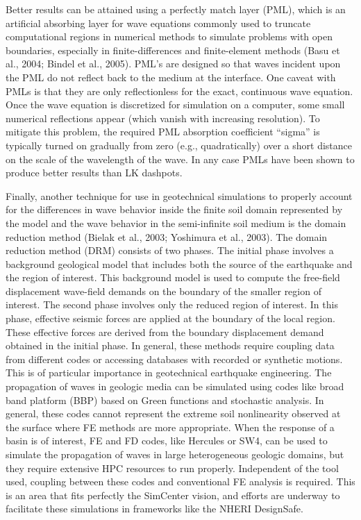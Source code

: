 Better results can be attained using a perfectly match layer (PML), which is an artificial absorbing layer for wave equations commonly used to truncate computational regions in numerical methods to simulate problems with open boundaries, especially in finite-differences and finite-element methods (Basu et al., 2004; Bindel et al., 2005). PML’s are designed so that waves incident upon the PML do not reflect back to the medium at the interface. One caveat with PMLs is that they are only reflectionless for the exact, continuous wave equation. Once the wave equation is discretized for simulation on a computer, some small numerical reflections appear (which vanish with increasing resolution). To mitigate this problem, the required PML absorption coefficient “sigma” is typically turned on gradually from zero (e.g., quadratically) over a short distance on the scale of the wavelength of the wave. In any case PMLs have been shown to produce better results than LK dashpots.

Finally, another technique for use in geotechnical simulations to properly account for the diﬀerences in wave behavior inside the ﬁnite soil domain represented by the model and the wave behavior in the semi-inﬁnite soil medium is the domain reduction method (Bielak et al., 2003; Yoshimura et al., 2003). The domain reduction method (DRM) consists of two phases. The initial phase involves a background geological model that includes both the source of the earthquake and the region of interest. This background model is used to compute the free-ﬁeld displacement wave-ﬁeld demands on the boundary of the smaller region of interest. The second phase involves only the reduced region of interest. In this phase, eﬀective seismic forces are applied at the boundary of the local region. These eﬀective forces are derived from the boundary displacement demand obtained in the initial phase. In general, these methods require coupling data from different codes or accessing databases with recorded or synthetic motions. This is of particular importance in geotechnical earthquake engineering. The propagation of waves in geologic media can be simulated using codes like broad band platform (BBP) based on Green functions and stochastic analysis. In general, these codes cannot represent the extreme soil nonlinearity observed at the surface where FE methods are more appropriate. When the response of a basin is of interest, FE and FD codes, like Hercules or SW4, can be used to simulate the propagation of waves in large heterogeneous geologic domains, but they require extensive HPC resources to run properly. Independent of the tool used, coupling between these codes and conventional FE analysis is required. This is an area that fits perfectly the SimCenter vision, and efforts are underway to facilitate these simulations in frameworks like the NHERI DesignSafe.

